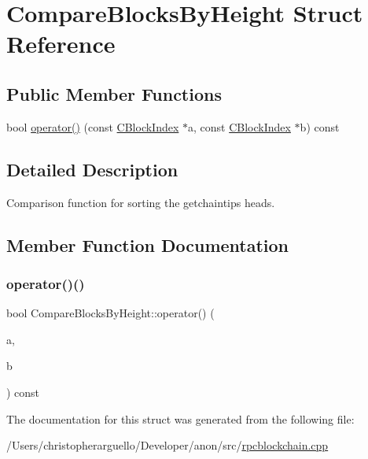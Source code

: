 \hypertarget{struct_compare_blocks_by_height}{}\section{Compare\+Blocks\+By\+Height Struct Reference}
\label{struct_compare_blocks_by_height}
\subsection*{Public Member Functions}
\begin{DoxyCompactItemize}
\item 
bool \mbox{\hyperlink{struct_compare_blocks_by_height_a613b9fc9c04de22e8e521f908c932454}{operator()}} (const \mbox{\hyperlink{class_c_block_index}{C\+Block\+Index}} $\ast$a, const \mbox{\hyperlink{class_c_block_index}{C\+Block\+Index}} $\ast$b) const
\end{DoxyCompactItemize}


\subsection{Detailed Description}
Comparison function for sorting the getchaintips heads. 

\subsection{Member Function Documentation}
\mbox{\label{struct_compare_blocks_by_height_a613b9fc9c04de22e8e521f908c932454}} 
\subsubsection{\texorpdfstring{operator()()}{operator()()}}
{\footnotesize\ttfamily bool Compare\+Blocks\+By\+Height\+::operator() (\begin{DoxyParamCaption}\item[{const \mbox{\hyperlink{class_c_block_index}{C\+Block\+Index}} $\ast$}]{a,  }\item[{const \mbox{\hyperlink{class_c_block_index}{C\+Block\+Index}} $\ast$}]{b }\end{DoxyParamCaption}) const\hspace{0.3cm}{\ttfamily [inline]}}



The documentation for this struct was generated from the following file\+:\begin{DoxyCompactItemize}
\item 
/\+Users/christopherarguello/\+Developer/anon/src/\mbox{\hyperlink{rpcblockchain_8cpp}{rpcblockchain.\+cpp}}\end{DoxyCompactItemize}
